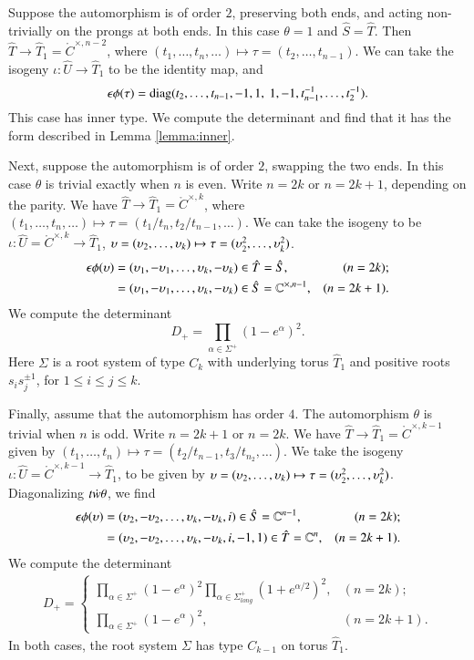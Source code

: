 Suppose the automorphism is of order $2$, preserving both ends, and
acting non-trivially on the prongs at both ends.  In this case
$\theta=1$ and $\hat S = \hat T$.  Then $\hat T\to \hat T_1 =
\ring{C}^{\times,n-2}$, where $(t_1,\ldots,t_n,\ldots)\mapsto \tau =
(t_2,\ldots,t_{n-1})$.  We can take the isogeny $\iota:\hat U\to \hat
T_1$ to be the identity map, and
\[
\epsilon\phi(\tau) 
= \op{diag}(t_2,\ldots,t_{n-1},-1,1,\ 1,-1,t_{n-1}^{-1},\ldots,t_2^{-1}).
\]
This case has inner type.  We compute the determinant and find that it
has the form described in Lemma \ref{lemma:inner}.

Next, suppose the automorphism is of order $2$, swapping the two ends.
In this case $\theta$ is trivial exactly when $n$ is even.  Write
$n=2k$ or $n=2k+1$, depending on the parity.  We have $\hat T\to \hat
T_1 = \ring{C}^{\times,k}$, where $(t_1,\ldots,t_n,\ldots)\mapsto
\tau=(t_1/t_n,t_2/t_{n-1},\ldots)$.  We can take the isogeny to be
$\iota:\hat U =\ring{C}^{\times,k}\to \hat T_1$, $\upsilon =
(\upsilon_2,\ldots,\upsilon_k)\mapsto \tau=(\upsilon_2^2,\ldots,\upsilon_k^2)$.
\begin{align*}
\epsilon \phi(\upsilon)
&= (\upsilon_1,-\upsilon_1,\ldots,\upsilon_k,-\upsilon_k) \in \hat T = \hat S, 
&(n=2k);\\
&= (\upsilon_1,-\upsilon_1,\ldots,\upsilon_k,-\upsilon_k)\in \hat S = \mathbb{C}^{\times,n-1}, 
&(n=2k+1).
\end{align*}
We compute the determinant
\begin{equation}
D_+ = \prod_{\alpha\in\Sigma^+} (1-e^\alpha)^2.
\end{equation}
Here $\Sigma$ is a root system of type $C_k$ with underlying torus
$\hat T_1$ and positive roots $s_i s_j^{\pm 1}$, for $1\le i\le j\le
k$.

Finally, assume that the automorphism has order $4$.  The automorphism
$\theta$ is trivial when $n$ is odd.  Write $n=2k+1$ or $n=2k$.  We
have $\hat T\to \hat T_1 = \ring{C}^{\times,k-1}$ given by
$(t_1,\ldots,t_n)\mapsto \tau = (t_2/t_{n-1},t_3/t_{n_2},\ldots)$.  We
take the isogeny $\iota:\hat U =\ring{C}^{\times,k-1}\to \hat T_1$, to
be given by $\upsilon = (\upsilon_2,\ldots,\upsilon_k)\mapsto \tau =
(\upsilon_2^2,\ldots,\upsilon_k^2)$.  Diagonalizing $t\dot w\theta$, we find
\begin{align}
\epsilon\phi(\upsilon) 
&= (\upsilon_2,-\upsilon_2,\ldots,\upsilon_k,-\upsilon_k,i)\in \hat S=\mathbb{C}^{n-1},
&(n=2k);\\
&= (\upsilon_2,-\upsilon_2,\ldots,\upsilon_k,-\upsilon_k,i,-1,1)\in \hat T = \mathbb{C}^n,
&(n=2k+1).
\end{align}
We compute the determinant
\begin{align*}
D_+ = \begin{cases}\prod_{\alpha\in \Sigma^+} 
(1-e^\alpha)^2 \prod_{\alpha\in \Sigma^+_{long}} (1+e^{\alpha/2})^2,&(n=2k);\\
          \prod_{\alpha\in\Sigma^+} (1-e^\alpha)^2,&(n=2k+1).
          \end{cases}
\end{align*}
In both cases, the root system $\Sigma$ has type $C_{k-1}$ on torus
$\hat T_1$.

